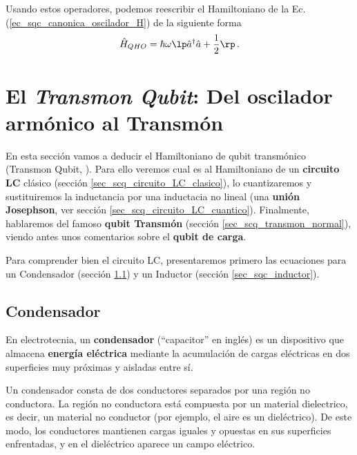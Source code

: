         Usando estos operadores, podemos reescribir el Hamiltoniano de la Ec. (\ref{ec_sqc_canonica_oscilador_H}) de la siguiente forma
        \begin{equation} \label{ec_sqc_qho_second_quant}
            \hat{H}_{QHO} = \hbar \omega \lp \hat{a}^\dagger \hat{a} + \frac{1}{2} \rp \, .
        \end{equation}







\newpage
\section{El \textit{Transmon Qubit}: Del oscilador armónico al Transmón} \label{sec_sub_scq_qho}
    
En esta sección vamos a deducir el Hamiltoniano de qubit transmónico (Transmon Qubit, \cite{bib_transmon_first_paper}). Para ello veremos cual es al Hamiltoniano de un \textbf{circuito LC} clásico (sección \ref{sec_scq_circuito_LC_clasico}), lo cuantizaremos y sustituiremos la inductancia por una inductacia no lineal (una \textbf{unión Josephson}, ver sección \ref{sec_scq_circuito_LC_cuantico}). Finalmente, hablaremos del famoso \textbf{qubit Transmón} (sección \ref{sec_scq_transmon_normal}), viendo antes unos comentarios sobre el \textbf{qubit de carga}.

Para comprender bien el circuito LC, presentaremos primero las ecuaciones para un Condensador (sección \ref{sec_sub_scq_condensador}) y un Inductor (sección \ref{sec_sqc_inductor}).
    
    
    \subsection{Condensador} \label{sec_sub_scq_condensador}

    En electrotecnia, un \textbf{condensador} (``capacitor'' en inglés) es un dispositivo que almacena \textbf{energía eléctrica} mediante la acumulación de cargas eléctricas en dos superficies muy próximas y aisladas entre sí. 
    
    Un condensador consta de dos conductores separados por una región no conductora. La región no conductora está compuesta por un material dielectrico, es decir, un material no conductor (por ejemplo, el aire es un dieléctrico). De este modo, los conductores mantienen cargas iguales y opuestas en sus superficies enfrentadas, y en el dieléctrico aparece un campo eléctrico. 
    
